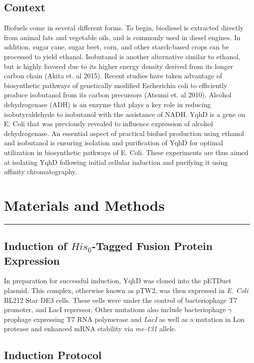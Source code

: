 \documentclass[12pt, letterpaper]{article}
\begin{document}
\subsection{Context}
Biofuels come in several different forms. To begin, biodiesel is extracted directly from animal fats and vegetable oils, and is commonly used in diesel engines. In addition, sugar cane, sugar beet, corn, and other starch-based crops can be processed to yield ethanol. Isobutanol is another alternative similar to ethanol, but is highly favored due to its higher energy density derived from its longer carbon chain (Akita et. al 2015). Recent studies have taken advantage of biosynthetic pathways of genetically modified Escherichia coli to efficiently produce isobutanol from its carbon precursors (Atsumi et. al 2010). Alcohol dehydrogenase (ADH) is an enzyme that plays a key role in reducing isobutyraldehyde to isobutanol with the assistance of NADH. YqhD is a gene on E. Coli that was previously revealed to influence expression of alcohol dehydrogenase. An essential aspect of practical biofuel production using ethanol and isobutanol is ensuring isolation and purification of YqhD for optimal utilization in biosynthetic pathways of E. Coli. These experiments are thus aimed at isolating YqhD following initial cellular induction and purifying it using affinity chromatography. 

\section{Materials and Methods}
\rule{\textwidth}{0.5pt}

\subsection{Induction of $His_6$-Tagged Fusion Protein Expression}
In preparation for successful induction, YqhD was cloned into the pETDuet plasmid. This complex, 
otherwise known as pTW2, was then expressed in \textit{E. Coli} BL212 Star DE3 cells. These cells
were under the control of bacteriophage T7 promoter, and LacI repressor. Other mutations also include
bacteriophage $\gamma$ prophage expressing T7 RNA polymerase and \textit{LacI} as well as a mutation 
in Lon protease and enhanced mRNA stability via \textit{me-131} allele. 

\subsection{Induction Protocol}
\end{document}

